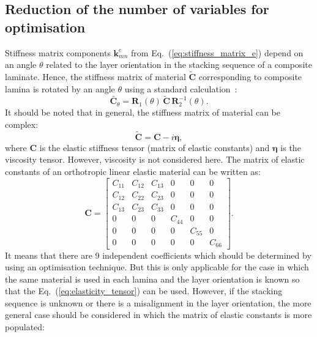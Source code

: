 \documentclass[preprint,12pt]{elsarticle}
\newcommand{\matr}[1]{\mathbf{#1}} %
\newcommand{\bs}[1]{\boldsymbol{#1}}
\begin{document}
 \subsection{Reduction of the number of variables for optimisation}
 Stiffness matrix components $\matr{k}_{mn}^e$ from Eq.~(\ref{eq:stiffness_matrix_e}) depend on an angle $\theta$ related to the layer orientation in the stacking sequence of a composite laminate. Hence, the stiffness matrix of material $\tilde{\matr{C}}$ corresponding to composite lamina is rotated by an angle $\theta$ using a standard calculation~\cite{Bartoli2006,Taupin2011}:
 \begin{equation}
	\tilde{ \matr{C}_{\theta}}= \matr{R}_1(\theta) \,\tilde{\matr{C}} \,\matr{R}_2^{-1}(\theta).
	 \label{eq:elasticity_tensor}
 \end{equation}
 It should be noted that in general, the stiffness matrix of material can be complex:
 \begin{equation}
 \tilde{\matr{C}}= \matr{C} - i \bs{\eta},
 \label{eq:complex_elasticity_tensor}
 \end{equation}
 where $\matr{C} $ is the elastic stiffness tensor (matrix of elastic constants) and $\bs{\eta}$ is the viscosity tensor. However, viscosity is not considered here. The matrix of elastic constants of an orthotropic linear elastic material can be written as:
 \begin{equation}
 \matr{C} = \left[\begin{array}{cccccc} C_{11} & C_{12}& C_{13} & 0&0&0\\[2pt]
 C_{12}& C_{22} & C_{23}& 0&0&0\\[2pt]
 C_{13}&C_{23}&C_{33}&0&0&0\\[2pt]
 0& 0 &0&C_{44}& 0&0\\[2pt]
 0&0&0&0&C_{55}&0\\[2pt]
  0&0&0&0&0&C_{66}
  \end{array}\right]. 
  \label{eq:elastic_constatns}
 \end{equation} 
 It means that there are 9 independent coefficients which should be determined by using an optimisation technique. But this is only applicable for the case in which the same material is used in each lamina and the layer orientation is known so that the Eq.~(\ref{eq:elasticity_tensor}) can be used. However, if the stacking sequence is unknown or there is a misalignment in the layer orientation, the more general case should be considered in which the matrix of elastic constants is more populated:
\end{document}
